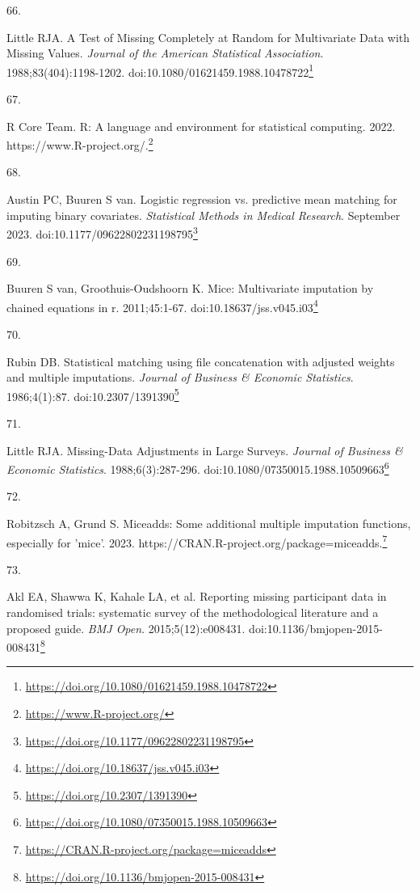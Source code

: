 \documentclass[
  a4paper,
]{book}
\newlength{\cslhangindent}
\newlength{\csllabelwidth}
\newlength{\cslentryspacingunit} %
\newenvironment{CSLReferences}[2] %
 {%
  \setlength{\parindent}{0pt}
  \ifodd #1
  \let\oldpar\par
  \def\par{\hangindent=\cslhangindent\oldpar}
  \fi
  \setlength{\parskip}{#2\cslentryspacingunit}
 }%
 {}
\newcommand{\CSLLeftMargin}[1]{\parbox[t]{\csllabelwidth}{#1}}
\newcommand{\CSLRightInline}[1]{\parbox[t]{\linewidth - \csllabelwidth}{#1}\break}
\renewcommand{\href}[2]{#2\footnote{\url{#1}}}
\begin{document}
\begin{CSLReferences}{0}{0}
\leavevmode{}%
\CSLLeftMargin{66. }%
\CSLRightInline{Little RJA. A Test of Missing Completely at Random for Multivariate Data with Missing Values. \emph{Journal of the American Statistical Association}. 1988;83(404):1198-1202. doi:\href{https://doi.org/10.1080/01621459.1988.10478722}{10.1080/01621459.1988.10478722}}

\leavevmode{}%
\CSLLeftMargin{67. }%
\CSLRightInline{R Core Team. R: A language and environment for statistical computing. 2022. \href{https://www.R-project.org/}{https://www.R-project.org/.}}

\leavevmode{}%
\CSLLeftMargin{68. }%
\CSLRightInline{Austin PC, Buuren S van. Logistic regression vs. predictive mean matching for imputing binary covariates. \emph{Statistical Methods in Medical Research}. September 2023. doi:\href{https://doi.org/10.1177/09622802231198795}{10.1177/09622802231198795}}

\leavevmode{}%
\CSLLeftMargin{69. }%
\CSLRightInline{Buuren S van, Groothuis-Oudshoorn K. {\textbraceleft}Mice{\textbraceright}: Multivariate imputation by chained equations in r. 2011;45:1-67. doi:\href{https://doi.org/10.18637/jss.v045.i03}{10.18637/jss.v045.i03}}

\leavevmode{}%
\CSLLeftMargin{70. }%
\CSLRightInline{Rubin DB. Statistical matching using file concatenation with adjusted weights and multiple imputations. \emph{Journal of Business \& Economic Statistics}. 1986;4(1):87. doi:\href{https://doi.org/10.2307/1391390}{10.2307/1391390}}

\leavevmode{}%
\CSLLeftMargin{71. }%
\CSLRightInline{Little RJA. Missing-Data Adjustments in Large Surveys. \emph{Journal of Business \& Economic Statistics}. 1988;6(3):287-296. doi:\href{https://doi.org/10.1080/07350015.1988.10509663}{10.1080/07350015.1988.10509663}}

\leavevmode{}%
\CSLLeftMargin{72. }%
\CSLRightInline{Robitzsch A, Grund S. Miceadds: Some additional multiple imputation functions, especially for 'mice'. 2023. \href{https://CRAN.R-project.org/package=miceadds}{https://CRAN.R-project.org/package=miceadds.}}

\leavevmode{}%
\CSLLeftMargin{73. }%
\CSLRightInline{Akl EA, Shawwa K, Kahale LA, et al. Reporting missing participant data in randomised trials: systematic survey of the methodological literature and a proposed guide. \emph{BMJ Open}. 2015;5(12):e008431. doi:\href{https://doi.org/10.1136/bmjopen-2015-008431}{10.1136/bmjopen-2015-008431}}


\end{CSLReferences}
\end{document}
